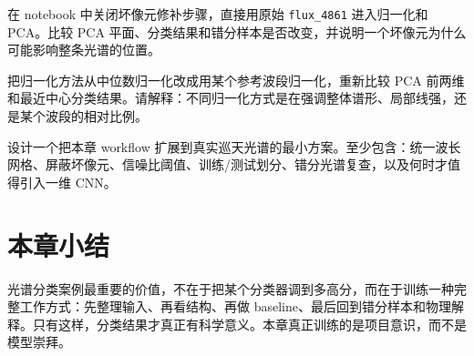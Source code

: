 \begin{exercisebox}[基础练习]
在 notebook 中关闭坏像元修补步骤，直接用原始 \texttt{flux\_4861} 进入归一化和 PCA。比较 PCA 平面、分类结果和错分样本是否改变，并说明一个坏像元为什么可能影响整条光谱的位置。
\end{exercisebox}

\begin{exercisebox}[进阶练习]
把归一化方法从中位数归一化改成用某个参考波段归一化，重新比较 PCA 前两维和最近中心分类结果。请解释：不同归一化方式是在强调整体谱形、局部线强，还是某个波段的相对比例。
\end{exercisebox}

\begin{exercisebox}[开放练习]
设计一个把本章 workflow 扩展到真实巡天光谱的最小方案。至少包含：统一波长网格、屏蔽坏像元、信噪比阈值、训练/测试划分、错分光谱复查，以及何时才值得引入一维 CNN。
\end{exercisebox}

\section{本章小结}

光谱分类案例最重要的价值，不在于把某个分类器调到多高分，而在于训练一种完整工作方式：先整理输入、再看结构、再做 baseline、最后回到错分样本和物理解释。只有这样，分类结果才真正有科学意义。本章真正训练的是项目意识，而不是模型崇拜。
